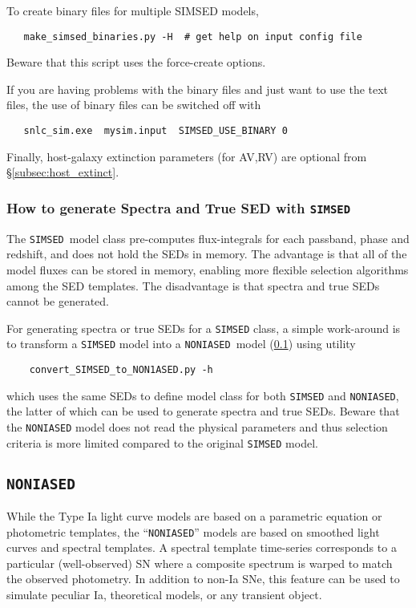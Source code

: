 \documentclass[12pt]{article}
\newcommand{\SIMSED}{{\tt SIMSED}}
\newcommand{\NONIA}{{\tt NONIASED}}
\begin{document}
To create binary files for multiple SIMSED models,
\vspace{-2mm}
\begin{verbatim}
   make_simsed_binaries.py -H  # get help on input config file
\end{verbatim}
\vspace{-2mm}
Beware that this script uses the force-create options.

If you are having problems with the binary files and just
want to use the text files, the use of binary files can
be switched off with
\begin{verbatim}
   snlc_sim.exe  mysim.input  SIMSED_USE_BINARY 0
\end{verbatim}

Finally, host-galaxy extinction parameters (for AV,RV) 
are optional from \S\ref{subsec:host_extinct}.

\subsubsection{How to generate Spectra and True SED with {\SIMSED} }
\label{sss:SIMSED_Spectra}

The \SIMSED\ model class pre-computes flux-integrals for each passband, phase and redshift,
and does not hold the SEDs in memory. The advantage is that all of the model fluxes can be
stored in memory, enabling more flexible selection algorithms among the SED templates.
The disadvantage is that spectra and true SEDs cannot be generated.

For generating spectra or true SEDs for a {\tt SIMSED} class, a simple work-around is
to transform a {\tt SIMSED} model into a \NONIA\ model (\ref{subsec:NON1A})
using utility
\begin{verbatim}
    convert_SIMSED_to_NON1ASED.py -h
\end{verbatim}
which uses the same SEDs to define model class for both {\tt SIMSED} and {\NONIA},
the latter of which can be used to generate spectra and true SEDs.
Beware that the {\NONIA} model does not read the physical parameters and thus
selection criteria is more limited compared to the original {\tt SIMSED} model.

\clearpage
\subsection{\NONIA}
\label{subsec:NON1A}

While the Type Ia light curve models are based on
a parametric equation or photometric templates, 
the ``{\NONIA}'' models are based on smoothed 
light curves and spectral templates.  
A spectral template time-series corresponds to a particular (well-observed)
SN where a composite spectrum is warped to match
the observed photometry.
In addition to non-Ia SNe, this feature can be used to
simulate peculiar Ia, theoretical models, or any transient object.
\end{document}
